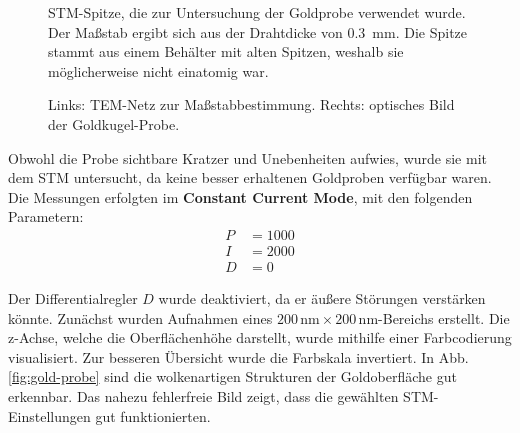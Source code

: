 \documentclass{article}
\begin{document}
\begin{figure}[h!]
    \centering
    \caption{STM-Spitze, die zur Untersuchung der Goldprobe verwendet wurde. Der Maßstab ergibt sich aus der Drahtdicke von \SI{0.3}{\mm}. Die Spitze stammt aus einem Behälter mit alten Spitzen, weshalb sie möglicherweise nicht einatomig war.}
    \label{fig:spitze-1}
\end{figure}
\newpage
\begin{figure}[h!]
    \centering
    \hfill
    \caption{Links: TEM-Netz zur Maßstabbestimmung. Rechts: optisches Bild der Goldkugel-Probe.}
    \label{fig:goldkugel-lupe}
\end{figure}

Obwohl die Probe sichtbare Kratzer und Unebenheiten aufwies, wurde sie mit dem STM untersucht, da keine besser erhaltenen Goldproben verfügbar waren. 
Die Messungen erfolgten im \textbf{Constant Current Mode}, mit den folgenden Parametern: 
\begin{align*}
    P &= 1000 \\
    I &= 2000 \\
    D &= 0
\end{align*}

Der Differentialregler $D$ wurde deaktiviert, da er äußere Störungen verstärken könnte. Zunächst wurden Aufnahmen eines $200 \, \text{nm} \times 200 \, \text{nm}$-Bereichs erstellt. Die z-Achse, welche die Oberflächenhöhe darstellt, wurde mithilfe einer Farbcodierung visualisiert. Zur besseren Übersicht wurde die Farbskala invertiert. In Abb. \ref{fig:gold-probe} sind die wolkenartigen Strukturen der Goldoberfläche gut erkennbar. Das nahezu fehlerfreie Bild zeigt, dass die gewählten STM-Einstellungen gut funktionierten.
\end{document}
